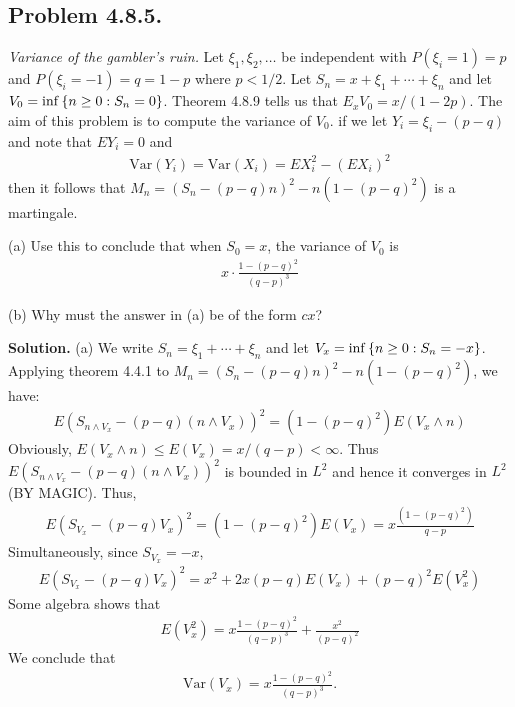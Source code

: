 \documentclass[12pt]{article}
\theoremstyle{definitionstyle}
\newcommand{\SET}[1]{\Set{\mskip-\medmuskip #1 \mskip-\medmuskip}}
\newcommand{\1}{\mathds 1}
\newcommand{\Var}{\mathrm{Var}}
\begin{document}
    \subsection*{Problem 4.8.5.} \textit{Variance of the gambler's ruin.} Let $\xi_1, \xi_2, \ldots$ be independent with $P(\xi_i = 1) = p$ and $P(\xi_i = -1) = q = 1-p$ where $p < 1/2$. Let $S_n = x + \xi_1 + \cdots + \xi_n$ and let $V_0 = \inf \SET{n \geq 0 : S_n = 0}$. Theorem 4.8.9 tells us that $E_x V_0 = x/(1-2p)$. The aim of this problem is to compute the variance of $V_0$. if we let $Y_i = \xi_i - (p-q)$ and note that $E Y_i = 0$ and 
    \begin{align*}
        \Var(Y_i) = \Var(X_i) = E X_i^2 - (E X_i)^2
    \end{align*}
    then it follows that $M_n = (S_n - (p-q)n)^2 - n(1-(p-q)^2)$ is a martingale. 

    (a) Use this to conclude that when $S_0 = x$, the variance of $V_0$ is 
    \begin{align*}
        x \cdot \frac{1 - (p-q)^2}{(q-p)^3}
    \end{align*}

    (b) Why must the answer in (a) be of the form $cx$?
    
    \textbf{Solution.}
    (a) We write $S_n = \xi_1 + \cdots + \xi_n$ and let $V_x = \inf \SET{n \geq 0 : S_n = -x}$. Applying theorem 4.4.1 to $M_n = (S_n - (p-q)n)^2 - n(1-(p-q)^2)$, we have:
    \begin{align*}
        E(S_{n \land V_x} - (p-q)(n \land V_x))^2 = (1-(p-q)^2)E(V_x \land n)
    \end{align*}
    Obviously, $E(V_x \land n) \leq E(V_x) = x/(q-p) < \infty$. Thus $E(S_{n \land V_x} - (p-q)(n \land V_x))^2$ is bounded in $L^2$ and hence it converges in $L^2$ (BY MAGIC). Thus,
    \begin{align*}
        E(S_{V_x} - (p-q)V_x)^2 = (1-(p-q)^2)E(V_x) = x\frac{(1-(p-q)^2)}{q-p}
    \end{align*}
    Simultaneously, since $S_{V_x} = -x$,
    \begin{align*}
        E(S_{V_x} - (p-q)V_x)^2 = x^2 + 2x(p-q)E(V_x) + (p-q)^2E(V_x^2)
    \end{align*}
    Some algebra shows that
    \begin{align*}
        E(V_x^2) = x \frac{1-(p-q)^2}{(q-p)^3} + \frac{x^2}{(p-q)^2}
    \end{align*}
    We conclude that
    \begin{align*}
        \Var(V_x) = x\frac{1-(p-q)^2}{(q-p)^3}.
    \end{align*}
\end{document}
